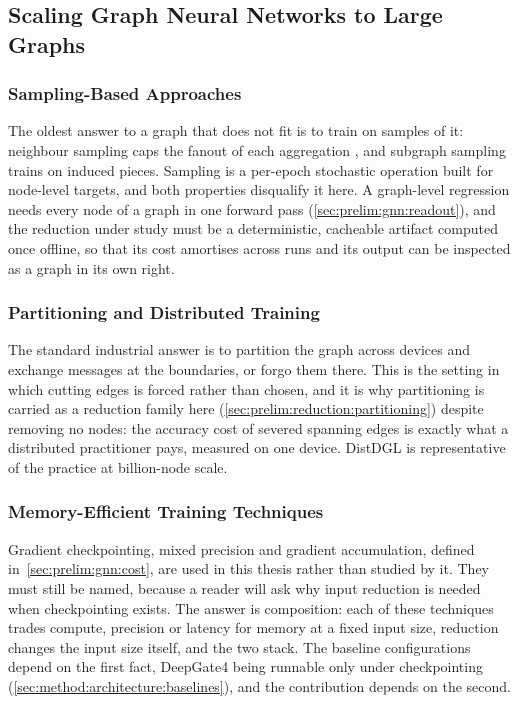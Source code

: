 \subsection{Scaling Graph Neural Networks to Large Graphs}
\label{sec:relwork:scaling}

\subsubsection{Sampling-Based Approaches}
\label{sec:relwork:scaling:sampling}
The oldest answer to a graph that does not fit is to train on samples of it: neighbour
sampling caps the fanout of each aggregation \citep{hamilton2017graphsage}, and subgraph
sampling trains on induced pieces. Sampling is a per-epoch stochastic operation built for
node-level targets, and both properties disqualify it here. A graph-level regression
needs every node of a graph in one forward pass (\ref{sec:prelim:gnn:readout}), and the
reduction under study must be a deterministic, cacheable artifact computed once offline,
so that its cost amortises across runs and its output can be inspected as a graph in its
own right.

\subsubsection{Partitioning and Distributed Training}
\label{sec:relwork:scaling:distributed}
The standard industrial answer is to partition the graph across devices and exchange
messages at the boundaries, or forgo them there. This is the setting in which cutting
edges is forced rather than chosen, and it is why partitioning is carried as a reduction
family here (\ref{sec:prelim:reduction:partitioning}) despite removing no nodes: the
accuracy cost of severed spanning edges is exactly what a distributed practitioner pays,
measured on one device. DistDGL \citep{zheng2020distdgl} is representative of the
practice at billion-node scale.

\subsubsection{Memory-Efficient Training Techniques}
\label{sec:relwork:scaling:memory}
Gradient checkpointing, mixed precision and gradient accumulation, defined
in~\ref{sec:prelim:gnn:cost}, are used in this thesis rather than studied by it. They
must still be named, because a reader will ask why input reduction is needed when
checkpointing exists. The answer is composition: each of these techniques trades
compute, precision or latency for memory at a fixed input size, reduction changes the
input size itself, and the two stack. The baseline configurations depend on the first
fact, DeepGate4 being runnable only under checkpointing
(\ref{sec:method:architecture:baselines}), and the contribution depends on the second.


